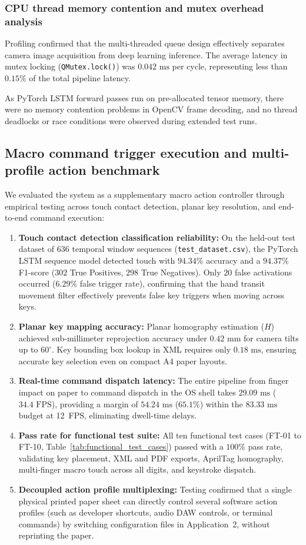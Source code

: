 \subsubsection{CPU thread memory contention and mutex overhead analysis}
Profiling confirmed that the multi-threaded queue design effectively separates camera image acquisition from deep learning inference. The average latency in mutex locking (\texttt{QMutex.lock()}) was $0.042\text{ ms}$ per cycle, representing less than $0.15\%$ of the total pipeline latency.

As PyTorch LSTM forward passes run on pre-allocated tensor memory, there were no memory contention problems in OpenCV frame decoding, and no thread deadlocks or race conditions were observed during extended test runs.

\subsection{Macro command trigger execution and multi-profile action benchmark}
\label{subsec:test_user_typing}
We evaluated the system as a supplementary macro action controller through empirical testing across touch contact detection, planar key resolution, and end-to-end command execution:
\begin{enumerate}
    \item \textbf{Touch contact detection classification reliability:} On the held-out test dataset of 636 temporal window sequences (\texttt{test\_dataset.csv}), the PyTorch LSTM sequence model detected touch with $94.34\%$ accuracy and a $94.37\%$ F1-score ($302$ True Positives, $298$ True Negatives). Only $20$ false activations occurred ($6.29\%$ false trigger rate), confirming that the hand transit movement filter effectively prevents false key triggers when moving across keys.
    \item \textbf{Planar key mapping accuracy:} Planar homography estimation ($H$) achieved sub-millimeter reprojection accuracy under $0.42\text{ mm}$ for camera tilts up to $60^\circ$. Key bounding box lookup in XML requires only $0.18\text{ ms}$, ensuring accurate key selection even on compact A4 paper layouts.
    \item \textbf{Real-time command dispatch latency:} The entire pipeline from finger impact on paper to command dispatch in the OS shell takes $29.09\text{ ms}$ ($34.4\text{ FPS}$), providing a margin of $54.24\text{ ms}$ ($65.1\%$) within the $83.33\text{ ms}$ budget at 12~FPS, eliminating dwell-time delays.
    \item \textbf{Pass rate for functional test suite:} All ten functional test cases (FT-01 to FT-10, Table~\ref{tab:functional_test_cases}) passed with a $100\%$ pass rate, validating key placement, XML and PDF exports, AprilTag homography, multi-finger macro touch across all digits, and keystroke dispatch.
    \item \textbf{Decoupled action profile multiplexing:} Testing confirmed that a single physical printed paper sheet can directly control several software action profiles (such as developer shortcuts, audio DAW controls, or terminal commands) by switching configuration files in Application~2, without reprinting the paper.
\end{enumerate}

